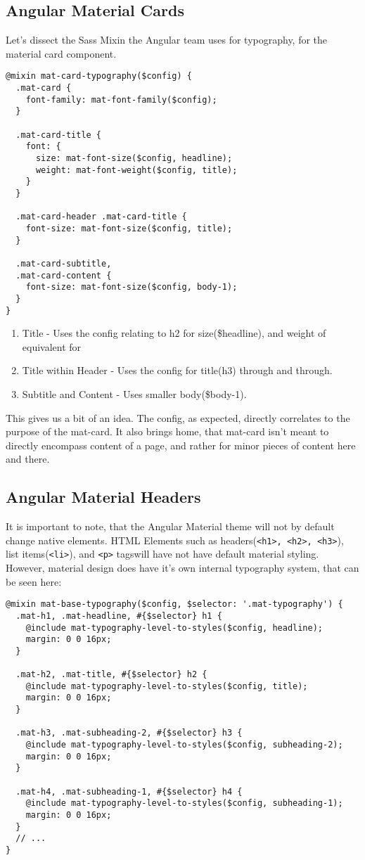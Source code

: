 \subsection{Angular Material Cards}
Let's dissect the Sass Mixin the Angular team uses for typography,
for the material card component. 
\begin{lstlisting}[caption=@angular/material/\_theming.scss]
@mixin mat-card-typography($config) {
  .mat-card {
    font-family: mat-font-family($config);
  }

  .mat-card-title {
    font: {
      size: mat-font-size($config, headline);
      weight: mat-font-weight($config, title);
    }
  }

  .mat-card-header .mat-card-title {
    font-size: mat-font-size($config, title);
  }

  .mat-card-subtitle,
  .mat-card-content {
    font-size: mat-font-size($config, body-1);
  }
}
\end{lstlisting}

\begin{enumerate}
  \item Title - Uses the config relating to h2 for size(\$headline), and 
  weight of equivalent for 
  \item Title within Header - Uses the config for title(h3) through and through.
  \item Subtitle and Content - Uses smaller body(\$body-1).
\end{enumerate}

This gives us a bit of an idea. The config, as expected, directly correlates to 
the purpose of the mat-card. It also brings home, that mat-card isn't meant to 
directly encompass content of a page, and rather for minor pieces of content 
here and there. 

\subsection{Angular Material Headers}
It is important to note, that the Angular Material theme will not by default 
change native elements. HTML Elements such as headers(\lstinline{<h1>, <h2>, <h3>}), 
list items(\lstinline{<li>}), and \lstinline{<p>} tagswill have not have default 
material styling. However, material design does have it's own internal typography 
system, that can be seen here: 
\begin{lstlisting}[caption=@angular/material/\_theming.scss]
@mixin mat-base-typography($config, $selector: '.mat-typography') {
  .mat-h1, .mat-headline, #{$selector} h1 {
    @include mat-typography-level-to-styles($config, headline);
    margin: 0 0 16px;
  }

  .mat-h2, .mat-title, #{$selector} h2 {
    @include mat-typography-level-to-styles($config, title);
    margin: 0 0 16px;
  }

  .mat-h3, .mat-subheading-2, #{$selector} h3 {
    @include mat-typography-level-to-styles($config, subheading-2);
    margin: 0 0 16px;
  }

  .mat-h4, .mat-subheading-1, #{$selector} h4 {
    @include mat-typography-level-to-styles($config, subheading-1);
    margin: 0 0 16px;
  }  
  // ...
}
\end{lstlisting}

